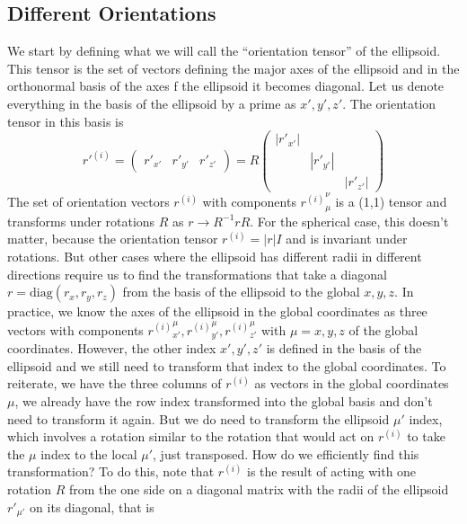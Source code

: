 \documentclass[nofootinbib,preprint,floatfix,titlepage,endfloats,superscriptaddress]{revtex4} %
\begin{document}
\subsection{Different Orientations}
We start by defining what we will call the ``orientation tensor'' of the ellipsoid. 
This tensor is the set of vectors defining the major axes of the ellipsoid and in the orthonormal basis of the axes f the ellipsoid it becomes diagonal. Let us denote everything in the basis of the ellipsoid by a prime as $x',y',z'$. The orientation tensor in this basis is  
\begin{equation}
    {r'}^{(i)} = \left(\begin{array}{c|c|c}r'_{x'} & r'_{y'} &r'_{z'}\end{array}
    \right) = R \begin{pmatrix}
    |r'_{x'}| \\ 
    & |r'_{y'}|\\ 
    & &|r'_{z'}|
    \end{pmatrix}
    \label{eq:ell}
\end{equation}
The set of orientation vectors $r^{(i)}$ with components ${r^{(i)}}_{\mu}^\nu$ is a (1,1) tensor and transforms under rotations $R$ as $r \to R^{-1} r R$. 
For the spherical case, this doesn't matter, because the orientation tensor $r^{(i)} = |r|I$ and is invariant under rotations. 
But other cases where the ellipsoid has different radii in different directions require us to find the transformations that take a diagonal $r = \mathrm{diag}(r_x,r_y,r_z)$ from the basis of the ellipsoid to the global $x,y,z$. 
In practice, we know the axes of the ellipsoid in the global coordinates as three vectors with components  ${r^{(i)}}_{x'}^\mu, {r^{(i)}}_{y'}^\mu, {r^{(i)}}_{z'}^\mu$ with $\mu = x,y,z$ of the global coordinates. However, the other index $x',y',z'$ is defined in the basis of the ellipsoid and we still need to transform that index to the global coordinates.  
To reiterate,  we have the three columns of $r^{(i)}$ as vectors in the global coordinates $\mu$, we already have the row index transformed into the global basis and don't need to transform it again. 
But we do need to transform the ellipsoid $\mu'$ index, which involves a rotation similar to the rotation that would act on $r^{(i)}$ to take the $\mu$ index to the local $\mu'$, just transposed. 
How do we efficiently find this transformation? 
To do this, note that $r^{(i)}$ is the result of acting with one rotation $R$ from the one side on a diagonal matrix with the radii of the ellipsoid $r'_{\mu'}$ on its diagonal, that is
\end{document}
